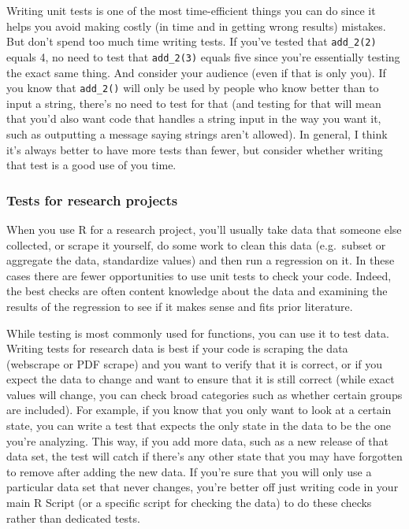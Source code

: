 \documentclass[
]{krantz}
\begin{document}
Writing unit tests is one of the most time-efficient things you can do since it helps you avoid making costly (in time and in getting wrong results) mistakes. But don't spend too much time writing tests. If you've tested that \texttt{add\_2(2)} equals 4, no need to test that \texttt{add\_2(3)} equals five since you're essentially testing the exact same thing. And consider your audience (even if that is only you). If you know that \texttt{add\_2()} will only be used by people who know better than to input a string, there's no need to test for that (and testing for that will mean that you'd also want code that handles a string input in the way you want it, such as outputting a message saying strings aren't allowed). In general, I think it's always better to have more tests than fewer, but consider whether writing that test is a good use of you time.

\hypertarget{tests-for-research-projects}{%
\subsubsection{Tests for research projects}\label{tests-for-research-projects}}

When you use R for a research project, you'll usually take data that someone else collected, or scrape it yourself, do some work to clean this data (e.g.~subset or aggregate the data, standardize values) and then run a regression on it. In these cases there are fewer opportunities to use unit tests to check your code. Indeed, the best checks are often content knowledge about the data and examining the results of the regression to see if it makes sense and fits prior literature.

While testing is most commonly used for functions, you can use it to test data. Writing tests for research data is best if your code is scraping the data (webscrape or PDF scrape) and you want to verify that it is correct, or if you expect the data to change and want to ensure that it is still correct (while exact values will change, you can check broad categories such as whether certain groups are included). For example, if you know that you only want to look at a certain state, you can write a test that expects the only state in the data to be the one you're analyzing. This way, if you add more data, such as a new release of that data set, the test will catch if there's any other state that you may have forgotten to remove after adding the new data. If you're sure that you will only use a particular data set that never changes, you're better off just writing code in your main R Script (or a specific script for checking the data) to do these checks rather than dedicated tests.
\end{document}
